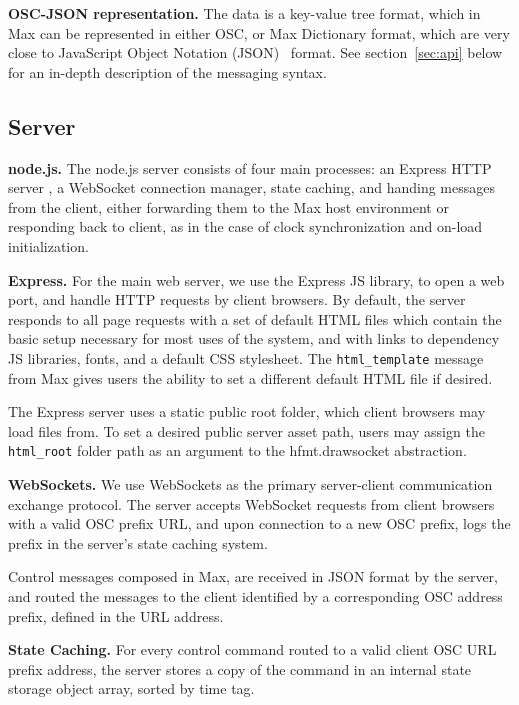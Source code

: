 \medskip
\noindent
\textbf{OSC-JSON representation.}
The \drawsocket data is a key-value tree format, which in Max can be represented in either OSC, or Max Dictionary format, which are very close to JavaScript Object Notation (JSON)~\cite{crockford2012json}  format. See section~\ref{sec:api} below for an in-depth description of the \drawsocket messaging syntax.

\subsection{Server}
\medskip
\noindent
\textbf{node.js.}
The node.js server consists of four main processes: an Express HTTP server \cite{express}, a WebSocket \cite{websockets} connection manager, state caching, and handing messages from the client, either forwarding them to the Max host environment or responding back to client, as in the case of clock synchronization and on-load initialization.

\medskip
\noindent
\textbf{Express.}
For the main web server, we use the Express JS library, to open a web port, and handle HTTP requests by client browsers. By default, the server responds to all page requests with a set of default HTML files which contain the basic setup necessary for most uses of the \drawsocket system, and with links to dependency JS libraries, fonts, and a default CSS stylesheet.
The \texttt{html\_template} message from Max gives users the ability to set a different default HTML file if desired.

The Express server uses a static public root folder, which client browsers may load files from. To set a desired public server asset path, users may assign the \texttt{html\_root} folder path as an argument to the hfmt.drawsocket abstraction.

\medskip
\noindent
\textbf{WebSockets.}
We use WebSockets as the primary server-client communication exchange protocol.
The server accepts WebSocket requests from client browsers with a valid OSC prefix URL, and upon connection to a new OSC prefix, logs the prefix in the server's state caching system.

Control messages composed in Max, are received in JSON format by the server, and routed the messages to the client identified by a corresponding OSC address prefix, defined in the URL address.

\medskip
\noindent
\textbf{State Caching.}
For every control command routed to a valid client OSC URL prefix address, the server stores a copy of the command in an internal state storage object array, sorted by time tag.

